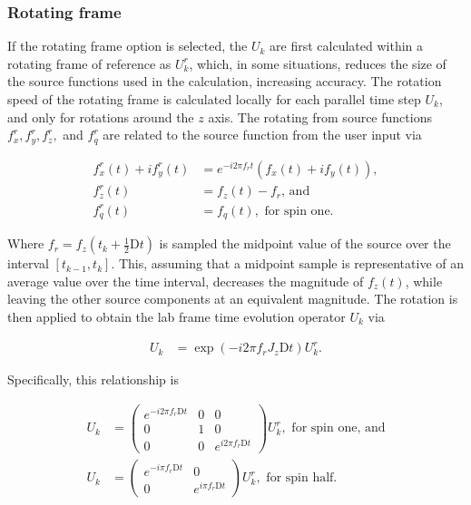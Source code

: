 \documentclass{jors}
\begin{document}
		\subsubsection*{Rotating frame}
			If the rotating frame option is selected, the \(U_k\) are first calculated within a rotating frame of reference as \(U^r_k\), which, in some situations, reduces the size of the source functions used in the calculation, increasing accuracy. The rotation speed of the rotating frame is calculated locally for each parallel time step \(U_k\), and only for rotations around the \(z\) axis. The rotating from source functions \(f^r_x, f^r_y, f^r_z,\) and \(f^r_q\) are related to the source function from the user input via
			
			\begin{align}
				f^r_x(t) + if^r_y(t) &= e^{-i 2\pi f_r t}(f_x(t) + if_y(t)),\\
				f^r_z(t) &= f_z(t) - f_r\textrm{, and}\\
				f^r_q(t) &= f_q(t), \textrm{ for spin one.}
			\end{align}
			
			Where \(f_r = f_z(t_k + \frac12\mathrm{D}t)\) is sampled the midpoint value of the source over the interval \([t_{k - 1}, t_k]\). This, assuming that a midpoint sample is representative of an average value over the time interval, decreases the magnitude of \(f_z(t)\), while leaving the other source components at an equivalent magnitude. The rotation is then applied to obtain the lab frame time evolution operator \(U_k\) via
			
			\begin{align}
				U_k &= \exp(-i 2 \pi f_r J_z \mathrm{D}t) U^r_k.
			\end{align}

			Specifically, this relationship is

			\begin{align}
				U_k &= \begin{pmatrix}
					e^{-i 2\pi f_r \mathrm{D}t} & 0 & 0\\
					0 & 1 & 0\\
					0 & 0 & e^{i 2\pi f_r \mathrm{D}t}
				\end{pmatrix} U^r_k, \textrm{ for spin one, and}\\
				U_k &= \begin{pmatrix}
					e^{-i \pi f_r \mathrm{D}t} & 0\\
					0 & e^{i \pi f_r \mathrm{D}t}
				\end{pmatrix} U^r_k, \textrm{ for spin half.}
			\end{align}
\end{document}
